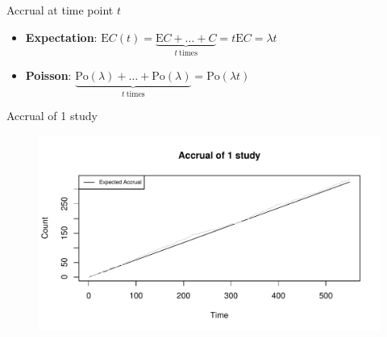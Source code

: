 \documentclass[english]{beamer}\usepackage[]{graphicx}\usepackage[]{xcolor}
\makeatletter
\def\maxwidth{ %
  \ifdim\Gin@nat@width>\linewidth
    \linewidth
  \else
    \Gin@nat@width
  \fi
}
\newenvironment{knitrout}{}{} %
\makeatother
\begin{document}
\begin{frame}{Accrual at time point $t$}
\begin{itemize}
\item \textbf{Expectation}: $\textrm{E}C(t) = \underbrace{\textrm{E} C +\ldots + C}_{t \ \text{times}} = t \textrm{E} C = \lambda t$
\item \textbf{Poisson}: $\underbrace{\textrm{Po} (\lambda) +\ldots +\textrm{Po} (\lambda)}_{t \ \text{times}} = \textrm{Po} (\lambda t)$
\end{itemize}
\end{frame}


\begin{frame}{Accrual of 1 study}

\begin{figure}

\begin{knitrout}
\color{fgcolor}
\includegraphics[width=\maxwidth]{figures/figunnamed-chunk-2-1} 
\end{knitrout}
 
\end{figure}


\end{frame}
\end{document}
